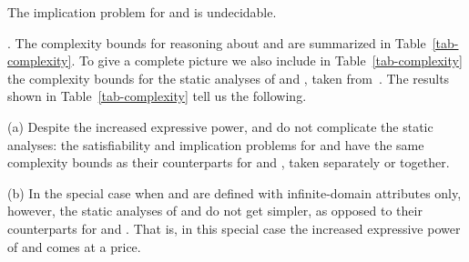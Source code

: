 \begin{cor}
\label{thm-IM-pcfd-pcind} The implication problem for \pCFDs and
\pCINDs is undecidable.\eop
\end{cor}



. The complexity bounds for reasoning about
\pCFDs and \pCINDs are summarized in Table~\ref{tab-complexity}.
To give a complete picture we also include
in Table~\ref{tab-complexity} the complexity bounds for
the static analyses of
\CFDs and \CINDs, taken from~\cite{CFDs,CINDs}. The results shown in
Table~\ref{tab-complexity} tell us the following.

\sstab
(a) Despite the increased expressive
power, \pCFDs and \pCINDs do not complicate the static analyses: the
satisfiability and implication problems for \pCFDs and \pCINDs have
the same complexity bounds as their
counterparts for \CFDs and \CINDs, taken separately or together.

\sstab
(b) In the special case when \pCFDs and \pCINDs are defined
with infinite-domain attributes only, however, the
static analyses of \pCFDs and \pCINDs
do not get simpler, as opposed to their counterparts for
\CFDs and \CINDs. That is, in this special case the increased
expressive power of \pCFDs and \pCINDs comes at a price.
